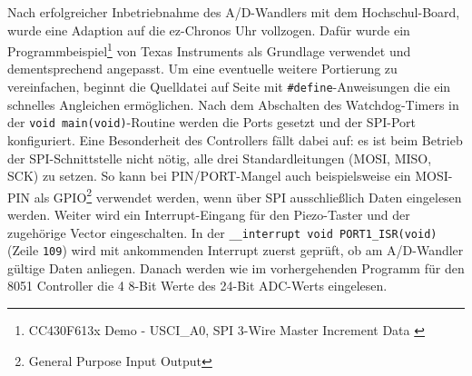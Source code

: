 \documentclass[12pt]{scrreprt} %
\begin{document}
Nach erfolgreicher Inbetriebnahme des A/D-Wandlers mit dem Hochschul-Board, wurde eine Adaption auf die ez-Chronos Uhr vollzogen. Dafür wurde ein Programmbeispiel\footnote{CC430F613x Demo - USCI\_A0, SPI 3-Wire Master Increment Data \citep{cc430f6137}} von Texas Instruments als Grundlage verwendet und dementsprechend angepasst. Um eine eventuelle weitere Portierung zu vereinfachen, beginnt die Quelldatei auf Seite \pageref{CC430_ADS1232} mit \lstinline$#define$-Anweisungen die ein schnelles Angleichen ermöglichen. Nach dem Abschalten des Watchdog-Timers in der \lstinline$void main(void)$-Routine werden die Ports gesetzt und der SPI-Port konfiguriert. Eine Besonderheit des Controllers fällt dabei auf: es ist beim Betrieb der SPI-Schnittstelle nicht nötig, alle drei Standardleitungen (MOSI, MISO, SCK) zu setzen. So kann bei PIN/PORT-Mangel auch beispielsweise ein MOSI-PIN als GPIO\footnote{General Purpose Input Output} verwendet werden, wenn über SPI ausschließlich Daten eingelesen werden. Weiter wird ein Interrupt-Eingang für den Piezo-Taster und der zugehörige Vector eingeschalten. 
In der \lstinline$__interrupt void PORT1_ISR(void)$ (Zeile \texttt{109}) wird mit ankommenden Interrupt zuerst geprüft, ob am A/D-Wandler gültige Daten anliegen. Danach werden wie im vorhergehenden Programm für den 8051 Controller die 4 8-Bit Werte des 24-Bit ADC-Werts eingelesen.
\newpage

\newpage

\newpage



\end{document}

